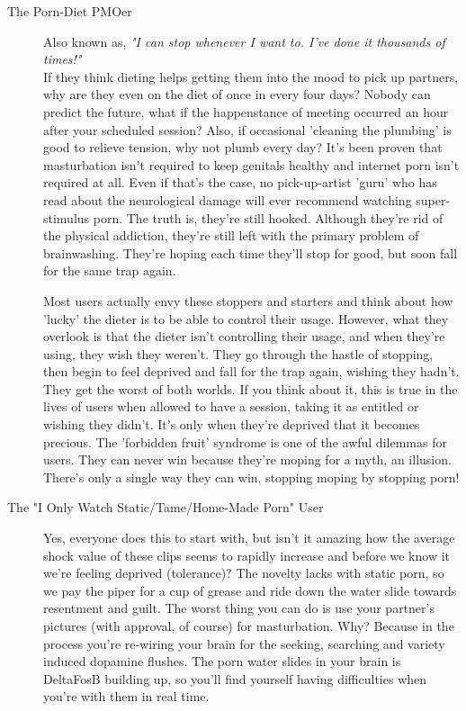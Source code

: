 \documentclass[easypeasy]{subfiles}
\begin{document}
\begin{description}
    \item [The Porn-Diet PMOer] Also known as, \textit{"I can stop whenever I want to. I've done it thousands of times!"} \\ If they think dieting helps getting them into the mood to pick up partners, why are they even on the diet of once in every four days? Nobody can predict the future, what if the happenstance of meeting occurred an hour after your scheduled session? Also, if occasional 'cleaning the plumbing' is good to relieve tension, why not plumb every day? It's been proven that masturbation isn't required to keep genitals healthy and internet porn isn't required at all. Even if that's the case, no pick-up-artist 'guru' who has read about the neurological damage will ever recommend watching super-stimulus porn. The truth is, they're still hooked. Although they're rid of the physical addiction, they're still left with the primary problem of brainwashing. They're hoping each time they'll stop for good, but soon fall for the same trap again.

  Most users actually envy these stoppers and starters and think about how 'lucky' the dieter is to be able to control their usage. However, what they overlook is that the dieter isn't controlling their usage, and when they're using, they wish they weren't. They go through the hastle of stopping, then begin to feel deprived and fall for the trap again, wishing they hadn't. They get the worst of both worlds. If you think about it, this is true in the lives of users when allowed to have a session, taking it as entitled or wishing they didn't. It's only when they're deprived that it becomes precious. The 'forbidden fruit' syndrome is one of the awful dilemmas for users. They can never win because they're moping for a myth, an illusion. There's only a single way they can win, stopping moping by stopping porn!

\item [The "I Only Watch Static/Tame/Home-Made Porn" User] Yes, everyone does this to start with, but isn't it amazing how the average shock value of these clips seems to rapidly increase and before we know it we're feeling deprived (tolerance)? The novelty lacks with static porn, so we pay the piper for a cup of grease and ride down the water slide towards resentment and guilt. The worst thing you can do is use your partner's pictures (with approval, of course) for masturbation. Why? Because in the process you're re-wiring your brain for the seeking, searching and variety induced dopamine flushes. The porn water slides in your brain is DeltaFosB building up, so you'll find yourself having difficulties when you're with them in real time.


\end{description}
\end{document}
